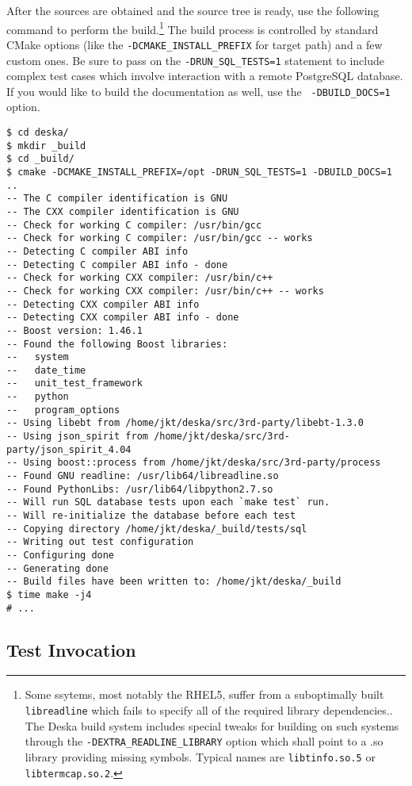 \documentclass[deska]{subfiles}
\begin{document}
After the sources are obtained and the source tree is ready, use the following command to perform the
build.\footnote{Some ssytems, most notably the RHEL5, suffer from a suboptimally built {\tt libreadline} which fails to
specify all of the required library dependencies.\cite{rhel5-readline-bug}.  The Deska build system includes special
tweaks for building on such systems through the {\tt -DEXTRA\_READLINE\_LIBRARY} option which shall point to a .so
library providing missing symbols.  Typical names are {\tt libtinfo.so.5} or {\tt libtermcap.so.2}.}  The build
process is controlled by standard CMake options (like the {\tt -DCMAKE\_INSTALL\_PREFIX} for target path) and a few
custom ones.  Be sure to pass on the {\tt -DRUN\_SQL\_TESTS=1} statement to include complex test cases which involve
interaction with a remote PostgreSQL database.  If you would like to build the documentation as well, use the {\tt
-DBUILD\_DOCS=1} option.

\begin{verbatim}
$ cd deska/
$ mkdir _build
$ cd _build/
$ cmake -DCMAKE_INSTALL_PREFIX=/opt -DRUN_SQL_TESTS=1 -DBUILD_DOCS=1 ..
-- The C compiler identification is GNU
-- The CXX compiler identification is GNU
-- Check for working C compiler: /usr/bin/gcc
-- Check for working C compiler: /usr/bin/gcc -- works
-- Detecting C compiler ABI info
-- Detecting C compiler ABI info - done
-- Check for working CXX compiler: /usr/bin/c++
-- Check for working CXX compiler: /usr/bin/c++ -- works
-- Detecting CXX compiler ABI info
-- Detecting CXX compiler ABI info - done
-- Boost version: 1.46.1
-- Found the following Boost libraries:
--   system
--   date_time
--   unit_test_framework
--   python
--   program_options
-- Using libebt from /home/jkt/deska/src/3rd-party/libebt-1.3.0
-- Using json_spirit from /home/jkt/deska/src/3rd-party/json_spirit_4.04
-- Using boost::process from /home/jkt/deska/src/3rd-party/process
-- Found GNU readline: /usr/lib64/libreadline.so
-- Found PythonLibs: /usr/lib64/libpython2.7.so
-- Will run SQL database tests upon each `make test` run.
-- Will re-initialize the database before each test
-- Copying directory /home/jkt/deska/_build/tests/sql
-- Writing out test configuration
-- Configuring done
-- Generating done
-- Build files have been written to: /home/jkt/deska/_build
$ time make -j4
# ...
\end{verbatim}

\subsection{Test Invocation}
\end{document}
